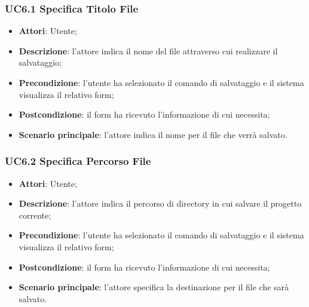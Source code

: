 \begin{itemize}
\begin{itemize}
\begin{itemize}
\begin{itemize}
\subsubsection{UC6.1 Specifica Titolo File}
\label{UC6.1}
\begin{itemize}
	\item \textbf{Attori}: Utente;
	\item \textbf{Descrizione}: l'attore indica il nome del file attraverso cui realizzare il salvataggio;
	\item \textbf{Precondizione}: l'utente ha selezionato il comando di salvataggio e il sistema visualizza il relativo form;
	\item \textbf{Postcondizione}: il form ha ricevuto l'informazione di cui necessita;
	\item \textbf{Scenario principale}: l'attore indica il nome per il file che verrà salvato.
\end{itemize}

\subsubsection{UC6.2 Specifica Percorso File}
\label{UC6.2}
\begin{itemize}
	\item \textbf{Attori}: Utente;
	\item \textbf{Descrizione}: l'attore indica il percorso di directory in cui salvare il progetto corrente;
	\item \textbf{Precondizione}: l'utente ha selezionato il comando di salvataggio e il sistema visualizza il relativo form;
	\item \textbf{Postcondizione}: il form ha ricevuto l'informazione di cui necessita;
	\item \textbf{Scenario principale}: l'attore specifica la destinazione per il file che sarà salvato.
\end{itemize}


\end{itemize}
\end{itemize}
\end{itemize}
\end{itemize}
